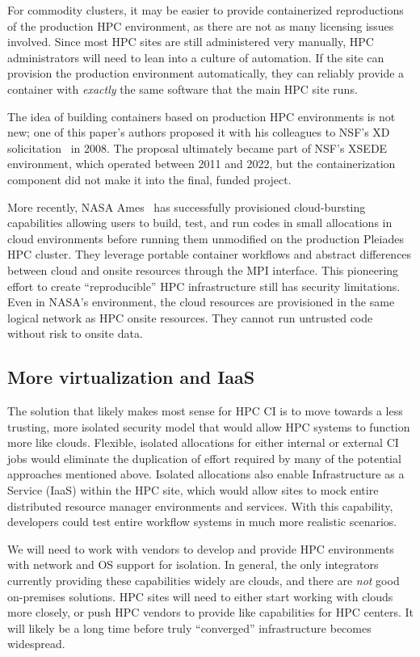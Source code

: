 \documentclass{IEEEcsmag}
\begin{document}
For commodity clusters, it may be easier to provide containerized reproductions of the
production HPC environment, as there are not as many licensing issues involved. 
Since most HPC sites are still administered very manually, HPC administrators will need
to lean into a culture of automation. If the site can provision the production environment
automatically, they can reliably provide a container with {\it exactly} the
same software that the main HPC site runs.

The idea of building containers based on production HPC environments is not new; one
of this paper's authors proposed it with his colleagues to NSF's XD
solicitation~\cite{NSF-XD} in 2008.  The proposal ultimately became part of NSF's
XSEDE environment, which operated between 2011 and 2022, but the containerization
component did not make it into the final, funded project.

More recently, NASA Ames~\cite{ames-hybrid-cloud} has successfully provisioned cloud-bursting
capabilities allowing users to build, test, and run codes in small allocations in cloud
environments before running them unmodified on the production Pleiades HPC cluster.
They leverage portable container workflows and abstract differences between cloud and
onsite resources through the MPI interface. This pioneering effort to create
``reproducible'' HPC infrastructure still has security limitations. Even in NASA's
environment, the cloud resources are provisioned in the same logical network as HPC
onsite resources. They cannot run untrusted code without risk to onsite data.

\subsection{More virtualization and IaaS}

The solution that likely makes most sense for HPC CI is to move towards a less trusting,
more isolated security model that would allow HPC systems to function more like clouds.
Flexible, isolated allocations for either internal or external CI jobs would
eliminate the duplication of effort required by many of the potential
approaches mentioned above. Isolated allocations also enable Infrastructure as a Service (IaaS)
within the HPC site, which would allow sites to mock entire distributed resource manager
environments and services. With this capability, developers could test entire workflow systems
in much more realistic scenarios.

We will need to work with vendors to develop and provide HPC environments with network
and OS support for isolation. In general, the only integrators currently providing these
capabilities widely are clouds, and there are {\it not} good on-premises solutions. HPC
sites will need to either start working with clouds more closely, or push
HPC vendors to provide like capabilities for HPC centers. It will likely be a long time
before truly ``converged'' infrastructure becomes widespread.
\end{document}
